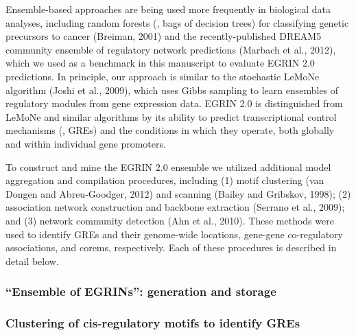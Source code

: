 Ensemble-based approaches are being used more frequently in biological
data analyses, including random forests (\ie, bags of decision trees)
for classifying genetic precursors to cancer (Breiman, 2001) and the
recently-published DREAM5 community ensemble of regulatory network
predictions (Marbach et al., 2012), which we used as a benchmark in
this manuscript to evaluate EGRIN 2.0 predictions. In principle, our
approach is similar to the stochastic LeMoNe algorithm (Joshi et al.,
2009), which uses Gibbs sampling to learn ensembles of regulatory
modules from gene expression data. EGRIN 2.0 is distinguished from
LeMoNe and similar algorithms by its ability to predict
transcriptional control mechanisms (\ie, GREs) and the conditions in
which they operate, both globally and within individual gene
promoters.

To construct and mine the EGRIN 2.0 ensemble we utilized additional
model aggregation and compilation procedures, including (1) motif
clustering (van Dongen and Abreu-Goodger, 2012) and scanning (Bailey
and Gribskov, 1998); (2) association network construction and backbone
extraction (Serrano et al., 2009); and (3) network community detection
(Ahn et al., 2010). These methods were used to identify GREs and their
genome-wide locations, gene-gene co-regulatory associations, and
corems, respectively. Each of these procedures is described in detail
below.

\subsubsection{``Ensemble of EGRINs'': generation and storage}

\subsubsection{Clustering of cis-regulatory motifs to identify GREs}

